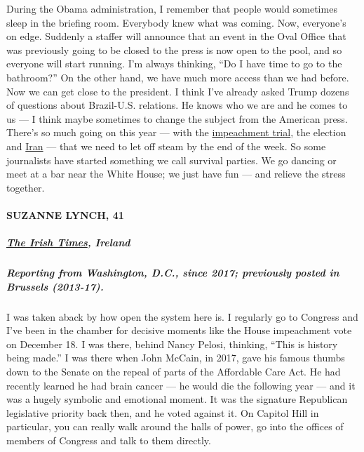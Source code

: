 During the Obama administration, I remember that people would sometimes
sleep in the briefing room. Everybody knew what was coming. Now,
everyone's on edge. Suddenly a staffer will announce that an event in
the Oval Office that was previously going to be closed to the press is
now open to the pool, and so everyone will start running. I'm always
thinking, ``Do I have time to go to the bathroom?'' On the other hand,
we have much more access than we had before. Now we can get close to the
president. I think I've already asked Trump dozens of questions about
Brazil-U.S. relations. He knows who we are and he comes to us --- I
think maybe sometimes to change the subject from the American press.
There's so much going on this year --- with the
\href{https://www.nytimes.com/2020/02/05/us/politics/impeachment-vote.html}{impeachment
trial}, the election and
\href{https://www.nytimes.com/2020/01/05/world/middleeast/Iran-us-trump.html}{Iran}
--- that we need to let off steam by the end of the week. So some
journalists have started something we call survival parties. We go
dancing or meet at a bar near the White House; we just have fun --- and
relieve the stress together.

\hypertarget{suzanne-lynch-41}{%
\paragraph{SUZANNE LYNCH, 41}\label{suzanne-lynch-41}}

\hypertarget{the-irish-times-ireland}{%
\subparagraph{\texorpdfstring{\textbf{\href{https://www.irishtimes.com/}{The
Irish Times},
Ireland}}{The Irish Times, Ireland}}\label{the-irish-times-ireland}}

\hypertarget{reporting-from-washington-dc-since-2017-previously-posted-in-brussels-2013-17}{%
\subparagraph{\texorpdfstring{\textbf{Reporting from Washington, D.C.,
since 2017; previously posted in Brussels
(2013-17).}}{Reporting from Washington, D.C., since 2017; previously posted in Brussels (2013-17).}}\label{reporting-from-washington-dc-since-2017-previously-posted-in-brussels-2013-17}}

I was taken aback by how open the system here is. I regularly go to
Congress and I've been in the chamber for decisive moments like the
House impeachment vote on December 18. I was there, behind Nancy Pelosi,
thinking, ``This is history being made.'' I was there when John McCain,
in 2017, gave his famous thumbs down to the Senate on the repeal of
parts of the Affordable Care Act. He had recently learned he had brain
cancer --- he would die the following year --- and it was a hugely
symbolic and emotional moment. It was the signature Republican
legislative priority back then, and he voted against it. On Capitol Hill
in particular, you can really walk around the halls of power, go into
the offices of members of Congress and talk to them directly.

